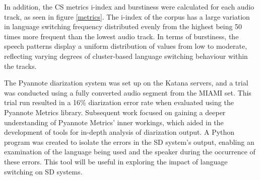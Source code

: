 \documentclass[11pt, a4paper]{report}
\begin{document}
\vspace*{10pt}
In addition, the CS metrics i-index and burstiness were calculated for each 
audio track, as seen in figure \ref*{metrics}. The i-index of the corpus 
has a large variation in language switching frequency distributed evenly from 
the highest being 50 times more frequent than the lowest audio track.  In terms 
of burstiness, the speech patterns display a uniform distribution of values 
from low to moderate, reflecting varying degrees of cluster-based language 
switching behaviour within the tracks. 

\vspace*{10pt}
The Pyannote diarization system was set up on the Katana servers, and a 
trial was conducted using a fully converted audio segment from the MIAMI 
set. This trial run resulted in a 16\% diarization error rate when 
evaluated using the Pyannote Metrics library.
Subsequent work focused on gaining a deeper understanding of Pyannote Metrics' 
inner workings, which aided in the development of tools for in-depth 
analysis of diarization output. A Python program was created to isolate 
the errors in the SD system's output, enabling an examination of the 
language being used and the speaker during the occurrence of these errors. 
This tool will be useful in exploring the impact of language switching 
on SD systems.
\end{document}
